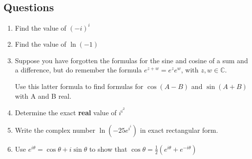 \documentclass[../main.tex]{subfiles}
\begin{document}
\subsection*{Questions}
\label{eulersformula}
\begin{enumerate}
    \item 
    Find the value of \((-i)^i\)

    \item 
    Find the value of \(\ln{(-1)}\)

    \item 
    Suppose you have forgotten the formulas for the sine and cosine of a sum and a difference, but do remember the formula \(e^{z+w}=e^z e^w\), with \(z, w \in \mathbb{C} \).

    Use this latter formula to find formulas for \(\cos{(A-B)}\) and \(\sin{(A+B)}\) with A and B real.

    \item 
    Determine the exact \textbf{real} value of \(i^{i^{2}}\)

    \item 
    Write the complex number \(\ln{(-25e^{i^{i}})}\) in exact rectangular form.

    \item 
    Use \(e^{i\theta}=\cos{\theta}+i\sin{\theta}\) to show that \(\cos{\theta}=\frac{1}{2}(e^{i\theta}+e^{-i\theta})\)
    
\end{enumerate}
\end{document}
